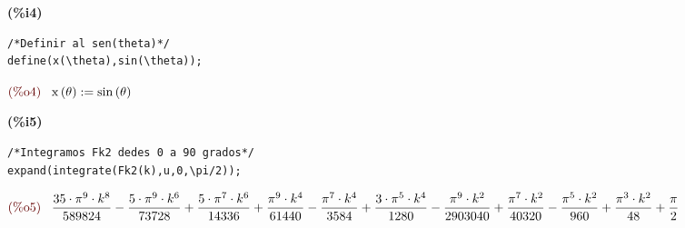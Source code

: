 \documentclass[12pt]{article}
\begin{document}
\noindent
\begin{minipage}[t]{8ex}\color{red}\bf
(\%i4) 
\end{minipage}
\begin{minipage}[t]{\textwidth}\color{blue}
\begin{verbatim}
/*Definir al sen(theta)*/
define(x(\theta),sin(\theta));
\end{verbatim}
\end{minipage}
\begin{math}
\displaystyle
\parbox{8ex}{\color{labelcolor}(\%o4) }
\mathrm{x}\left( \theta\right) :=\mathrm{sin}\left( \theta\right) \mbox{}
\end{math}

\noindent
\begin{minipage}[t]{8ex}\color{red}\bf
(\%i5) 
\end{minipage}
\begin{minipage}[t]{\textwidth}\color{blue}
\begin{verbatim}
/*Integramos Fk2 dedes 0 a 90 grados*/
expand(integrate(Fk2(k),u,0,\pi/2));
\end{verbatim}
\end{minipage}
\begin{math}
\displaystyle
\parbox{8ex}{\color{labelcolor}(\%o5) }
\frac{35\cdot {{\pi}^{9}}\cdot {{k}^{8}}}{589824}-\frac{5\cdot {{\pi}^{9}}\cdot {{k}^{6}}}{73728}+\frac{5\cdot {{\pi}^{7}}\cdot {{k}^{6}}}{14336}+\frac{{{\pi}^{9}}\cdot {{k}^{4}}}{61440}-\frac{{{\pi}^{7}}\cdot {{k}^{4}}}{3584}+\frac{3\cdot {{\pi}^{5}}\cdot {{k}^{4}}}{1280}-\frac{{{\pi}^{9}}\cdot {{k}^{2}}}{2903040}+\frac{{{\pi}^{7}}\cdot {{k}^{2}}}{40320}-\frac{{{\pi}^{5}}\cdot {{k}^{2}}}{960}+\frac{{{\pi}^{3}}\cdot {{k}^{2}}}{48}+\frac{\pi}{2}\mbox{}
\end{math}
\end{document}
